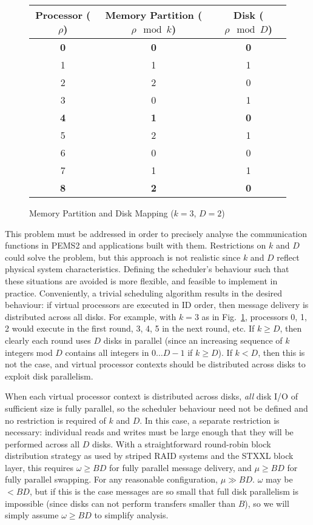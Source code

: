 \documentclass[12pt]{carletoncsthesis}
\begin{document}
\begin{figure}[ht]
\begin{center}
\begin{tabular}[]{c|c|c}
Processor ($\rho$) & Memory Partition ($\rho \mod k$) & Disk ($\rho \mod D$) \\ \hline
\textbf 0 & \textbf 0 & \textbf 0 \\
1         & 1         & 1 \\
2         & 2         & 0 \\
3         & 0         & 1 \\
\textbf 4 & \textbf 1 & \textbf 0 \\
5         & 2         & 1 \\
6         & 0         & 0 \\
7         & 1         & 1 \\
\textbf 8 & \textbf 2 & \textbf 0 \\
\end{tabular}
\end{center}
\caption{Memory Partition and Disk Mapping ($k=3$, $D=2$)}
\label{part-disk-mapping}
\end{figure}

This problem must be addressed in order to precisely analyse the communication
functions in PEMS2 and applications built with them.  Restrictions
on $k$ and $D$ could solve the problem, but this approach is not realistic
since $k$ and $D$ reflect physical system characteristics.  Defining the
scheduler's behaviour such that these situations are avoided is more flexible,
and feasible to implement in practice.  Conveniently, a trivial scheduling
algorithm results in the desired behaviour: if virtual processors are
executed in ID order, then message delivery is distributed across all disks.
For example, with $k=3$ as in Fig.~\ref{part-disk-mapping}, processors 0, 1,
2 would execute in the first round, 3, 4, 5 in the next round, etc.  If $k \ge
D$, then clearly each round uses $D$ disks in parallel (since an increasing
sequence of $k$ integers mod $D$ contains all integers in $0 \dots D-1$ if
$k \ge D$).  If $k < D$, then this is not the case, and virtual processor
contexts should be distributed across disks to exploit disk parallelism.

When each virtual processor context is distributed across disks, {\em all}
disk I/O of sufficient size is fully parallel, so the scheduler behaviour
need not be defined and no restriction is required of $k$ and $D$.  In this
case, a separate restriction is necessary: individual reads and writes must
be large enough that they will be performed across all $D$ disks.  With a
straightforward round-robin block distribution strategy as used by striped RAID
systems and the STXXL block layer, this requires $\omega \ge BD$ for fully
parallel message delivery, and $\mu \ge BD$ for fully parallel swapping.
For any reasonable configuration, $\mu \gg BD$.  $\omega$ may be $< BD$,
but if this is the case messages are so small that full disk parallelism
is impossible (since disks can not perform transfers smaller than $B$),
so we will simply assume $\omega \ge BD$ to simplify analysis.
\end{document}
